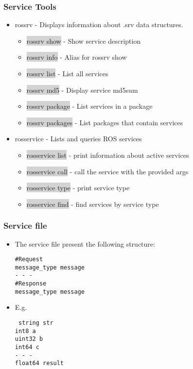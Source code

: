 \documentclass{beamer}
\begin{document}
	\begin{frame}
		\frametitle{Service Tools}
		\begin{itemize}
			\item{rossrv - Displays information about .srv data structures.}
			\begin{itemize}
				\item{\colorbox{lightgray}{rossrv show} - Show service description}
				\item{\colorbox{lightgray}{rossrv info} - Alias for rossrv show}
				\item{\colorbox{lightgray}{rossrv list} - List all services}
				\item{\colorbox{lightgray}{rossrv md5} - Display service md5sum}
				\item{\colorbox{lightgray}{rossrv package} - List services in a package}
				\item{\colorbox{lightgray}{rossrv packages} - List packages that contain services}
				
			\end{itemize}
			\item{rosservice - Lists and queries ROS services}
			\begin{itemize}
				\item{\colorbox{lightgray}{rosservice list} - print information about active services}
				\item{\colorbox{lightgray}{rosservice call} - call the service with the provided args}
				\item{\colorbox{lightgray}{rosservice type} - print service type}
				\item{\colorbox{lightgray}{rosservice find} - find services by service type}
			\end{itemize}
		\end{itemize}
	\end{frame}
	\begin{frame}
		\frametitle{Service file}
		\begin{itemize}
			\item{The service file present the following structure: \\
				  \begin{center}
				  	\texttt{\#Request\\
				  message\_type message\\
				  - - -\\
				  \#Response\\
				  message\_type message}
				  \end{center}}
			\item{E.g. \\\begin{center}
				\texttt{
						string str\\
					int8 a\\
					uint32 b\\
					int64 c\\
					- - -\\
					float64 result}
					\end{center}
				}
		\end{itemize}
	\end{frame}
\end{document}
